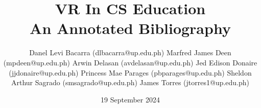 \documentclass[11pt]{article}
\title{VR In CS Education\\\medskip An Annotated Bibliography}
\author{
	Danel Levi Bacarra (dlbacarra@up.edu.ph)
	Marfred James Deen (mpdeen@up.edu.ph)
	Arwin Delasan (avdelasan@up.edu.ph)
	Jed Edison Donaire (jjdonaire@up.edu.ph)
	Princess Mae Parages (pbparages@up.edu.ph)
	Sheldon Arthur Sagrado (smsagrado@up.edu.ph)
	James Torres (jtorres1@up.edu.ph)
}
\date{19 September 2024}
\begin{document}
\maketitle
\nocite{*} %


\end{document}
